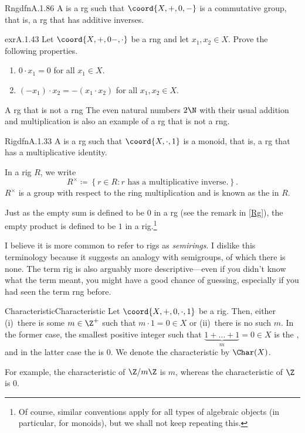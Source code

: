 \begin{dfn}{Rng}{dfnA.1.86}
A  is a rg such that $\coord{X,+,0,-}$ is a commutative group, that is, a rg that has additive inverses.
\end{dfn}
\begin{exr}{}{exrA.1.43}
Let $\coord{X,+,0-,\cdot}$ be a rng and let $x_1,x_2\in X$.  Prove the following properties.
\begin{enumerate}
\item $0\cdot x_1=0$ for all $x_1\in X$.
\item $(-x_1)\cdot x_2=-(x_1\cdot x_2)$ for all $x_1,x_2\in X$.
\end{enumerate}
\end{exr}
\begin{exm}{A rg that is not a rng}{}
The even natural numbers $2\N$ with their usual addition and multiplication is also an example of a rg that is not a rng.
\end{exm}
\begin{dfn}{Rig}{dfnA.1.33}
A  is a rg such that $\coord{X,\cdot ,1}$ is a monoid, that is, a rg that has a multiplicative identity.
\begin{rmk}
In a rig $R$, we write
\begin{equation}\label{eqnA.1.34}
    R^{\times}\coloneqq \left\{ r\in R:r\text{ has a multiplicative inverse.}\right\} .
\end{equation}
$R^{\times}$ is a group with respect to the ring multiplication and is known as the  in $R$.
\end{rmk}
\begin{rmk}
Just as the empty sum is defined to be $0$ in a rg (see the remark in \cref{Rg}), the empty product is defined to be $1$ in a rig.\footnote{Of course, similar conventions apply for all types of algebraic objects (in particular, for monoids), but we shall not keep repeating this.}
\end{rmk}
\begin{rmk}
I believe it is more common to refer to rigs as \emph{semirings}.  I dislike this terminology because it suggests an analogy with semigroups, of which there is none.  The term rig is also arguably more descriptive---even if you didn't know what the term meant, you might have a good chance of guessing, especially if you had seen the term rng before.
\end{rmk}
\end{dfn}
\begin{dfn}{Characteristic}{Characteristic}
Let $\coord{X,+,0,\cdot ,1}$ be a rig.  Then, either (i)~there is some $m\in \Z ^+$ such that $m\cdot 1=0\in X$ or (ii)~there is no such $m$.  In the former case, the smallest positive integer such that $\underbrace{1+\dots +1}_m=0\in X$ is the , and in the latter case the  is $0$.  We denote the characteristic by $\Char (X)$.
\begin{rmk}
For example, the characteristic of $\Z /m\Z$ is $m$, whereas the characteristic of $\Z$ is $0$.
\end{rmk}
\end{dfn}

